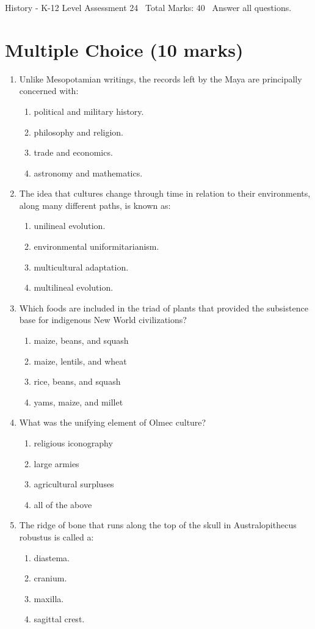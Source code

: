 \documentclass[12pt]{article}
\begin{document}
\begin{center}
History - K-12 Level Assessment 24 \
Total Marks: 40 \
Answer all questions.
\end{center}

\section*{Multiple Choice (10 marks)}
\begin{enumerate}[label=\arabic*.]
\item Unlike Mesopotamian writings, the records left by the Maya are principally concerned with:
\begin{enumerate}[label=(\alph*)]
    \item political and military history.
    \item philosophy and religion.
    \item trade and economics.
    \item astronomy and mathematics.
\end{enumerate}
\item The idea that cultures change through time in relation to their environments, along many different paths, is known as:
\begin{enumerate}[label=(\alph*)]
    \item unilineal evolution.
    \item environmental uniformitarianism.
    \item multicultural adaptation.
    \item multilineal evolution.
\end{enumerate}
\item Which foods are included in the triad of plants that provided the subsistence base for indigenous New World civilizations?
\begin{enumerate}[label=(\alph*)]
    \item maize, beans, and squash
    \item maize, lentils, and wheat
    \item rice, beans, and squash
    \item yams, maize, and millet
\end{enumerate}
\item What was the unifying element of Olmec culture?
\begin{enumerate}[label=(\alph*)]
    \item religious iconography
    \item large armies
    \item agricultural surpluses
    \item all of the above
\end{enumerate}
\item The ridge of bone that runs along the top of the skull in Australopithecus robustus is called a:
\begin{enumerate}[label=(\alph*)]
    \item diastema.
    \item cranium.
    \item maxilla.
    \item sagittal crest.
\end{enumerate}
\end{enumerate}
\end{document}
